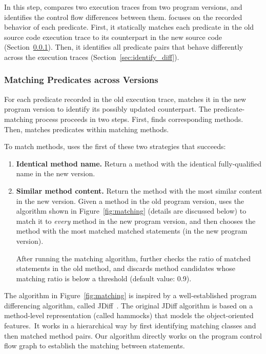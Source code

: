 

In this step, \ourtool compares two execution traces
from two program versions, and identifies the
control flow differences between them. \ourtool focuses on the
recorded behavior of each predicate.
First, it statically
matches each predicate in the old
source code execution trace to its counterpart in the new source code
(Section~\ref{sec:match_predicate}).
Then, it identifies all predicate pairs that
behave differently across the execution traces (Section~\ref{sec:identify_diff}).


\subsubsection{Matching Predicates across Versions}
\label{sec:match_predicate}

For each predicate recorded in the old execution trace,
\ourtool matches it in the new program version to identify
its possibly updated counterpart.
The predicate-matching process proceeds in two steps.
First, \ourtool finds corresponding methods.
Then, \ourtool matches predicates within matching methods.

To match methods, \ourtool uses
the first of these two strategies that succeeds:



\begin{enumerate}
\item \textbf{Identical method name.} Return a method with the identical
fully-qualified name in the new version.
\item \textbf{Similar method content.} Return the method with
the most similar content in the new version. Given
a method in the old program version, \ourtool
uses the algorithm shown in Figure~\ref{fig:matching}
(details are discussed below) to match it
to \textit{every} method in the new program version, and then
chooses the method with the most matched matched statements
(in the new program version).

After running the matching algorithm, \ourtool further checks the ratio of
matched statements in the old method, and discards method candidates whose
matching ratio is below a threshold (default value: 0.9).
\end{enumerate}

The algorithm in Figure~\ref{fig:matching} is inspired by
a well-established program differencing algorithm, called
JDiff~\cite{Apiwattanapong:2004}. The original JDiff
algorithm is based on a method-level representation
(called hammocks) that models the object-oriented features.\
It works in a hierarchical way by first identifying matching
classes and then matched method pairs. Our
algorithm directly works on the program control flow graph
to establish the matching between statements.


